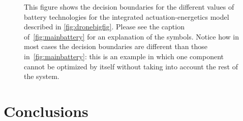 \begin{figure}
\begin{centering}
{\begin{centering}
\par\end{centering}
}
\par\end{centering}
\begin{centering}
\par\end{centering}
\caption{\label{fig:drone_choice}This figure shows the decision boundaries
for the different values of battery technologies for the integrated
actuation-energetics model described in \cref{fig:dronebigfig}. Please
see the caption of~\cref{fig:mainbattery} for an explanation of the
symbols. Notice how in most cases the decision boundaries are different
than those in~\cref{fig:mainbattery}: this is an example in which
one component cannot be optimized by itself without taking into account
the rest of the system.}
\end{figure}






\section{Conclusions}

